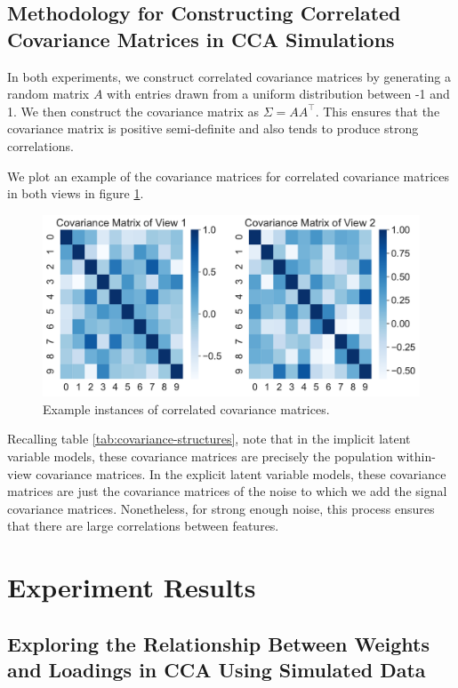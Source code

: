 \subsection{Methodology for Constructing Correlated Covariance Matrices in CCA Simulations}

In both experiments, we construct correlated covariance matrices by generating a random matrix $A$ with entries drawn from a uniform distribution between -1 and 1.
We then construct the covariance matrix as $\Sigma = AA^\top$.
This ensures that the covariance matrix is positive semi-definite and also tends to produce strong correlations.

We plot an example of the covariance matrices for correlated covariance matrices in both views in figure \ref{fig:covariance-matrices}.

\begin{figure}
    \centering
    \includegraphics[width=0.8\linewidth]{figures/simulated/explicit/True_Covariance_Correlated.pdf}
    \caption{Example instances of correlated covariance matrices.}\label{fig:covariance-matrices}
\end{figure}

Recalling table \ref{tab:covariance-structures}, note that in the implicit latent variable models, these covariance matrices are precisely the population within-view covariance matrices.
In the explicit latent variable models, these covariance matrices are just the covariance matrices of the noise to which we add the signal covariance matrices.
Nonetheless, for strong enough noise, this process ensures that there are large correlations between features.

\section{Experiment Results}

\subsection{Exploring the Relationship Between Weights and Loadings in CCA Using Simulated Data}

